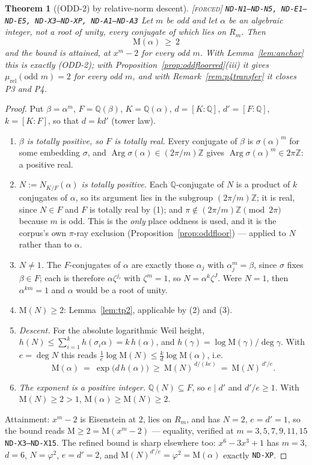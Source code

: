\documentclass[11pt]{article}
\newcommand{\tagF}{\textcolor{cF}{\textsc{[forced]}}}
\newcommand{\hx}[1]{\textcolor{cC}{\footnotesize\texttt{#1}}}
\newcommand{\Q}{\mathbb{Q}}
\newcommand{\Z}{\mathbb{Z}}
\newcommand{\gp}{\varphi}
\newcommand{\M}{\mathrm{M}}
\DeclareMathOperator{\Arg}{Arg}
\theoremstyle{plain}
\newtheorem{theorem}{Theorem}[section]
\theoremstyle{definition}
\theoremstyle{remark}
\begin{document}
\begin{theorem}[(ODD-2) by relative-norm descent]\label{thm:odd2nd}\tagF{} \hx{ND-N1--ND-N5, ND-E1--ND-E5, ND-X3--ND-XP, ND-A1--ND-A3}
Let $m$ be odd and let $\alpha$ be an algebraic integer, not a root of unity,
every conjugate of which lies on $R_m$. Then
\[
\boxed{\ \M(\alpha)\ \ge\ 2\ }
\]
and the bound is attained, at $x^m-2$ for every odd $m$. With
Lemma~\ref{lem:anchor} this is exactly (ODD-2); with
Proposition~\ref{prop:oddfloorred}(iii) it gives
$\mu_{\mathrm{rel}}(\text{odd }m)=2$ for every odd $m$, and with
Remark~\ref{rem:p4transfer} it closes P3 and P4.
\end{theorem}

\begin{proof}
Put $\beta=\alpha^m$, $F=\Q(\beta)$, $K=\Q(\alpha)$, $d=[K:\Q]$, $d'=[F:\Q]$,
$k=[K:F]$, so that $d=kd'$ (tower law).
\begin{enumerate}[nosep,label=(\arabic*),leftmargin=2.2em]
\item \emph{$\beta$ is totally positive, so $F$ is totally real.} Every
conjugate of $\beta$ is $\sigma(\alpha)^m$ for some embedding $\sigma$, and
$\Arg\sigma(\alpha)\in(2\pi/m)\Z$ gives $\Arg\sigma(\alpha)^m\in2\pi\Z$: a
positive real.
\item \emph{$N:=N_{K/F}(\alpha)$ is totally positive.} Each $\Q$-conjugate of
$N$ is a product of $k$ conjugates of $\alpha$, so its argument lies in the
subgroup $(2\pi/m)\Z$; it is real, since $N\in F$ and $F$ is totally real by
(1); and $\pi\notin(2\pi/m)\Z\pmod{2\pi}$ because $m$ is odd. This is the
\emph{only} place oddness is used, and it is the corpus's own $\pi$-ray
exclusion (Proposition~\ref{prop:oddfloor}) --- applied to $N$ rather than to
$\alpha$.
\item \emph{$N\neq1$.} The $F$-conjugates of $\alpha$ are exactly those
$\alpha_j$ with $\alpha_j^m=\beta$, since $\sigma$ fixes $\beta\in F$; each is
therefore $\alpha\zeta^{j_i}$ with $\zeta^m=1$, so $N=\alpha^k\zeta^J$. Were
$N=1$, then $\alpha^{km}=1$ and $\alpha$ would be a root of unity.
\item \emph{$\M(N)\ge2$}: Lemma~\ref{lem:tp2}, applicable by (2) and (3).
\item \emph{Descent.} For the absolute logarithmic Weil height,
$h(N)\le\sum_{i=1}^{k}h(\sigma_i\alpha)=k\,h(\alpha)$, and
$h(\gamma)=\log\M(\gamma)/\deg\gamma$. With $e=\deg N$ this reads
$\tfrac1e\log\M(N)\le\tfrac k d\log\M(\alpha)$, i.e.
\[
\M(\alpha)\ =\ \exp\bigl(d\,h(\alpha)\bigr)\ \ge\ \M(N)^{\,d/(ke)}\ =\ \M(N)^{\,d'/e}.
\]
\item \emph{The exponent is a positive integer.} $\Q(N)\subseteq F$, so
$e\mid d'$ and $d'/e\ge1$. With $\M(N)\ge2>1$, $\M(\alpha)\ge\M(N)\ge2$.
\end{enumerate}
Attainment: $x^m-2$ is Eisenstein at $2$, lies on $R_m$, and has $N=2$,
$e=d'=1$, so the bound reads $\M\ge2=\M(x^m-2)$ --- equality, verified at
$m=3,5,7,9,11,15$ \hx{ND-X3--ND-X15}. The refined bound is sharp elsewhere too:
$x^6-3x^3+1$ has $m=3$, $d=6$, $N=\gp^2$, $e=d'=2$, and
$\M(N)^{d'/e}=\gp^2=\M(\alpha)$ exactly \hx{ND-XP}.
\end{proof}
\end{document}
